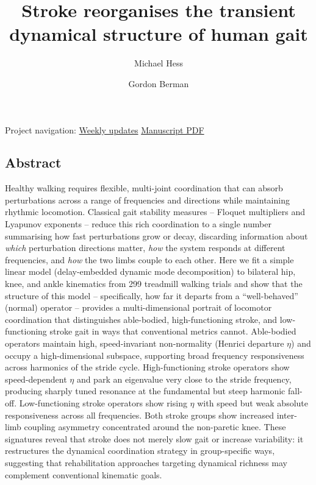 \documentclass[
  letterpaper,
  DIV=11,
  numbers=noendperiod]{scrartcl}
\title{Stroke reorganises the transient dynamical structure of human
gait}
\author{Michael Hess \and Gordon Berman}
\date{}
\begin{document}
\maketitle


\begin{tcolorbox}[enhanced jigsaw, titlerule=0mm, coltitle=black, rightrule=.15mm, arc=.35mm, opacityback=0, opacitybacktitle=0.6, breakable, left=2mm, bottomtitle=1mm, colbacktitle=quarto-callout-note-color!10!white, toptitle=1mm, toprule=.15mm, leftrule=.75mm, colframe=quarto-callout-note-color-frame, title=\textcolor{quarto-callout-note-color}{\faInfo}\hspace{0.5em}{Note}, bottomrule=.15mm, colback=white]

Project navigation: \href{weekly_updates/}{Weekly updates} \textbar{}
\href{index.pdf}{Manuscript PDF}

\end{tcolorbox}

\subsection{Abstract}\label{abstract}

Healthy walking requires flexible, multi-joint coordination that can
absorb perturbations across a range of frequencies and directions while
maintaining rhythmic locomotion. Classical gait stability measures --
Floquet multipliers and Lyapunov exponents -- reduce this rich
coordination to a single number summarising how fast perturbations grow
or decay, discarding information about \emph{which} perturbation
directions matter, \emph{how} the system responds at different
frequencies, and \emph{how} the two limbs couple to each other. Here we
fit a simple linear model (delay-embedded dynamic mode decomposition) to
bilateral hip, knee, and ankle kinematics from 299 treadmill walking
trials and show that the structure of this model -- specifically, how
far it departs from a ``well-behaved'' (normal) operator -- provides a
multi-dimensional portrait of locomotor coordination that distinguishes
able-bodied, high-functioning stroke, and low-functioning stroke gait in
ways that conventional metrics cannot. Able-bodied operators maintain
high, speed-invariant non-normality (Henrici departure \(\eta\)) and
occupy a high-dimensional subspace, supporting broad frequency
responsiveness across harmonics of the stride cycle. High-functioning
stroke operators show speed-dependent \(\eta\) and park an eigenvalue
very close to the stride frequency, producing sharply tuned resonance at
the fundamental but steep harmonic fall-off. Low-functioning stroke
operators show rising \(\eta\) with speed but weak absolute
responsiveness across all frequencies. Both stroke groups show increased
inter-limb coupling asymmetry concentrated around the non-paretic knee.
These signatures reveal that stroke does not merely slow gait or
increase variability: it restructures the dynamical coordination
strategy in group-specific ways, suggesting that rehabilitation
approaches targeting dynamical richness may complement conventional
kinematic goals.
\end{document}

